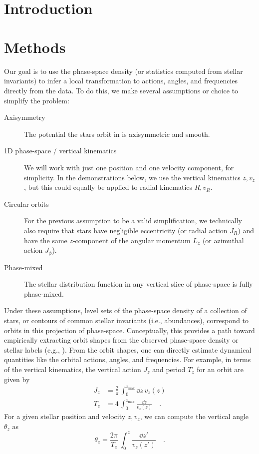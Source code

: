 
\section*{~}\clearpage

\section{Introduction} \label{sec:intro}


\section{Methods} \label{sec:methods}

Our goal is to use the phase-space density (or statistics computed from stellar
invariants) to infer a local transformation to actions, angles, and frequencies directly
from the data.
To do this, we make several assumptions or choice to simplify the problem:
\begin{description}
    \item[Axisymmetry] The potential the stars orbit in is axisymmetric and smooth.
    \item[1D phase-space / vertical kinematics] We will work with just one position and
    one velocity component, for simplicity. In the demonstrations below, we use the
    vertical kinematics $z, v_z$, but this could equally be applied to radial
    kinematics $R, v_R$.
    \item[Circular orbits] For the previous assumption to be a valid simplification, we
    technically also require that stars have negligible eccentricity (or radial action
    $J_R$) and have the same $z$-component of the angular momentum $L_z$ (or azimuthal
    action $J_\phi$).
    \item[Phase-mixed] The stellar distribution function in any vertical slice of
    phase-space is fully phase-mixed.
\end{description}
Under these assumptions, level sets of the phase-space density of a collection of stars,
or contours of common stellar invariants (i.e., abundances), correspond to orbits in
this projection of phase-space.
Conceptually, this provides a path toward empirically extracting orbit shapes from the
observed phase-space density or stellar labels (e.g., \citealt{Price-Whelan:2021}).
From the orbit shapes, one can directly estimate dynamical quantities like the orbital
actions, angles, and frequencies.
For example, in terms of the vertical kinematics, the vertical action $J_z$ and period $T_z$ for an orbit are given by
\begin{align}
    J_z &= \frac{2}{\pi} \, \int_0^{z_{\textrm{max}}} \dd z \, v_z(z) \\
    T_z &= 4 \, \int_0^{z_{\textrm{max}}} \frac{\dd z}{v_z(z)}\quad .
\end{align}
For a given stellar position and velocity $z, v_z$, we can compute the vertical angle $\theta_z$ as
\begin{equation}
    \theta_z = \frac{2\pi}{T_z} \, \int_0^{z} \frac{\dd z'}{v_z(z')} \quad .
\end{equation}

